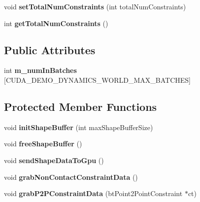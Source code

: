 \begin{DoxyCompactItemize}
\item 
\hypertarget{classbt_gpu_demo_dynamics_world_ad49ee3e13a758c6280e3554309051cf6}{void {\bfseries set\+Total\+Num\+Constraints} (int total\+Num\+Constraints)}\label{classbt_gpu_demo_dynamics_world_ad49ee3e13a758c6280e3554309051cf6}

\item 
\hypertarget{classbt_gpu_demo_dynamics_world_a0ae4436ee8549e11d2124650cdf9cc08}{int {\bfseries get\+Total\+Num\+Constraints} ()}\label{classbt_gpu_demo_dynamics_world_a0ae4436ee8549e11d2124650cdf9cc08}

\end{DoxyCompactItemize}
\subsection*{Public Attributes}
\begin{DoxyCompactItemize}
\item 
\hypertarget{classbt_gpu_demo_dynamics_world_af42457a66a95afecdcd55e68d58a0fa6}{int {\bfseries m\+\_\+num\+In\+Batches} \mbox{[}C\+U\+D\+A\+\_\+\+D\+E\+M\+O\+\_\+\+D\+Y\+N\+A\+M\+I\+C\+S\+\_\+\+W\+O\+R\+L\+D\+\_\+\+M\+A\+X\+\_\+\+B\+A\+T\+C\+H\+E\+S\mbox{]}}\label{classbt_gpu_demo_dynamics_world_af42457a66a95afecdcd55e68d58a0fa6}

\end{DoxyCompactItemize}
\subsection*{Protected Member Functions}
\begin{DoxyCompactItemize}
\item 
\hypertarget{classbt_gpu_demo_dynamics_world_acdade06554ad175f99e676ef27b6cf60}{void {\bfseries init\+Shape\+Buffer} (int max\+Shape\+Buffer\+Size)}\label{classbt_gpu_demo_dynamics_world_acdade06554ad175f99e676ef27b6cf60}

\item 
\hypertarget{classbt_gpu_demo_dynamics_world_afedb753d897a04bc4ee0adf209383d07}{void {\bfseries free\+Shape\+Buffer} ()}\label{classbt_gpu_demo_dynamics_world_afedb753d897a04bc4ee0adf209383d07}

\item 
\hypertarget{classbt_gpu_demo_dynamics_world_a3f570254ce4db4a1eda4c56586768576}{void {\bfseries send\+Shape\+Data\+To\+Gpu} ()}\label{classbt_gpu_demo_dynamics_world_a3f570254ce4db4a1eda4c56586768576}

\item 
\hypertarget{classbt_gpu_demo_dynamics_world_a0ca590a0c86e8180f0c5da3de7167610}{void {\bfseries grab\+Non\+Contact\+Constraint\+Data} ()}\label{classbt_gpu_demo_dynamics_world_a0ca590a0c86e8180f0c5da3de7167610}

\item 
\hypertarget{classbt_gpu_demo_dynamics_world_aef17c68738da830101efb8f83f051d9c}{void {\bfseries grab\+P2\+P\+Constraint\+Data} (bt\+Point2\+Point\+Constraint $\ast$ct)}\label{classbt_gpu_demo_dynamics_world_aef17c68738da830101efb8f83f051d9c}

\end{DoxyCompactItemize}
